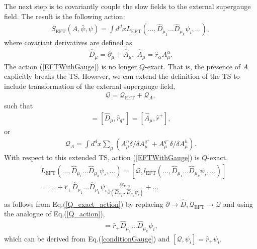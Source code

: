 \documentclass[final,5p,10pt,times,twocolumn,year]{elsarticle}
\begin{document}
The next step is to covariantly couple the slow fields to the external supergauge field. The result is the following action:
\begin{eqnarray}\label{EFT_Lagrangian}
S_\text{EFT}(A, \bar\psi, \psi ) = \int d^{d}x L_\text{EFT}( ..., \hat D_{\mu_1} ... \hat D_{\mu_k} \psi_i,...),\label{EFTWithGauge}
\end{eqnarray}
where covariant derivatives are defined as
\begin{eqnarray}
\hat D_\mu = \partial_\mu + \hat A_\mu, \; \hat A_\mu = \hat r_\alpha A^\alpha_\mu.\label{DefOfhatA}
\end{eqnarray} 
The action (\ref{EFTWithGauge}) is no longer $Q$-exact. That is, the presence of $A$ explicitly breaks the TS. However, we can extend the definition of the TS to include transformation of the external supergauge field,
\begin{eqnarray}
    \mathcal{Q} = \mathcal{Q}_\text{EFT} + \mathcal{Q}_A,\label{TS_TOTAL}
\end{eqnarray}
such that
\begin{eqnarray}
[\mathcal{Q}_A, \hat D_\mu] = [\hat D_\mu, {\hat r}_{q^+}] = [\hat A_\mu, \hat r^+],\label{conditionGauge}
\end{eqnarray}
or 
\begin{eqnarray}
\mathcal{Q}_{A} = \int d^{d}x\sum\nolimits_{\mu} ( A_\mu^{n}\delta/\delta A_\mu^{q^+} + A_\mu^{q^-}\delta/\delta A_\mu^{h}).\label{TS_A}
\end{eqnarray}
With respect to this extended TS, action (\ref{EFTWithGauge}) is $Q$-exact,
\begin{eqnarray}
    &L_\text{EFT}( ..., \hat D_{\mu_1} ... \hat D_{\mu_k} \psi_i,...) = [\mathcal{Q}, l_\text{EFT}(..., \hat D_{\mu_1} ... \hat D_{\mu_k} \psi_i,...)]\nonumber\\
    &= ... + \hat r_+ \hat D_{\mu_1} ... \hat D_{\mu_k} \psi_i \frac{\partial l_\text{EFT}}{\partial (\hat D_{\mu_1} ... \hat D_{\mu_k} \psi_i)}  + ...\label{Q_exact_action_}
\end{eqnarray}
as follows from Eq.(\ref{Q_exact_action}) by replacing $\partial\to \hat D, \mathcal{Q}_\text{EFT}\to\mathcal{Q}$ and using the analogue of Eq.(\ref{Q_action}),
\begin{eqnarray}
    [\mathcal{Q}, \hat D_{\mu_1} ... \hat D_{\mu_k} \psi_i] = \hat r_+ \hat D_{\mu_1} ... \hat D_{\mu_k}  \psi_i,
\end{eqnarray}
which can be derived from Eq.(\ref{conditionGauge}) and $[\mathcal{Q}, \psi_i]= \hat r_+ \psi_i$.
\end{document}
